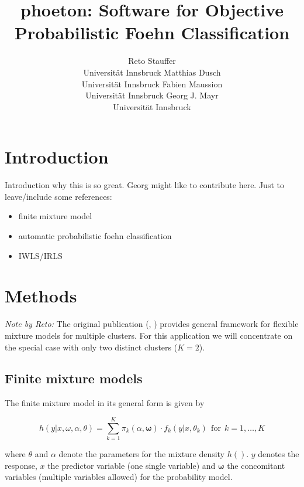 \documentclass[article,nojss,shortnames]{jss}
\author{Reto Stauffer\\Universit\"at Innsbruck
\And Matthias Dusch\\Universit\"at Innsbruck
\AND Fabien Maussion\\Universit\"at Innsbruck
\And Georg J. Mayr\\Universit\"at Innsbruck}
\title{phoeton: Software for Objective Probabilistic Foehn Classification}
\begin{document}
\section{Introduction}

Introduction why this is so great. Georg might like to contribute
here. Just to leave/include some references:

\begin{itemize}
    \item finite mixture model \citep{leisch2004,gruen2008}
    \item automatic probabilistic foehn classification \cite{plavcan2014}
    \item IWLS/IRLS \citep{mccullagh1989}
\end{itemize}



\section{Methods}

\textit{Note by Reto:}
The original publication (, \citealt{gruen2008})
provides general framework for flexible mixture models for multiple
clusters. For this application we will concentrate on the special
case with only two distinct clusters ($K = 2$).

\subsection{Finite mixture models}

The finite mixture model in its general form is given by

\begin{equation}
    h(\mathit{y} | \mathit{x}, \mathit{\omega}, \mathit{\alpha}, \mathit{\theta}) =
        \sum_{k=1}^K \pi_k(\mathit{\alpha}, \mathbf{\omega}) \cdot f_k(\mathit{y} | \mathit{x}, \mathit{\theta}_k)
        ~~\text{for}~~k=1,\dots,K
    \label{eqn:flexmix-density-general}
\end{equation}

where $\mathit{\theta}$ and $\mathit{\alpha}$ denote the parameters for the
mixture density $h()$. $\mathit{y}$ denotes the response, $\mathit{x}$ the
predictor variable (one single variable) and $\mathbf{\omega}$ the concomitant
variables (multiple variables allowed) for the probability model.
\end{document}
